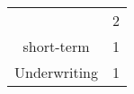 \documentclass[]{book}
\begin{document}
\begin{longtable}[]{@{}cc@{}}
\begin{minipage}[t]{0.43\columnwidth}
\end{minipage} & \begin{minipage}[t]{0.05\columnwidth}\centering\strut
2\strut
\end{minipage}\tabularnewline
\begin{minipage}[t]{0.43\columnwidth}\centering\strut
short-term\strut
\end{minipage} & \begin{minipage}[t]{0.05\columnwidth}\centering\strut
1\strut
\end{minipage}\tabularnewline
\begin{minipage}[t]{0.43\columnwidth}\centering\strut
Underwriting\strut
\end{minipage} & \begin{minipage}[t]{0.05\columnwidth}\centering\strut
1\strut
\end{minipage}\tabularnewline
\bottomrule
\end{longtable}


\end{document}
